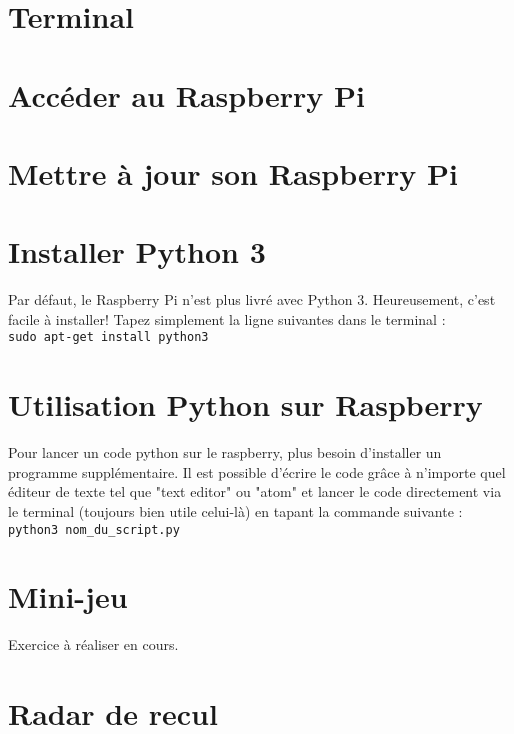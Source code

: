 \section{Terminal}


\section{Accéder au Raspberry Pi}


\section{Mettre à jour son Raspberry Pi}


\section{Installer Python 3}
Par défaut, le Raspberry Pi n'est plus livré avec Python 3. Heureusement, c'est facile à installer! Tapez simplement la ligne suivantes dans le terminal :\\

\texttt{sudo apt-get install python3}\\


\section{Utilisation Python sur Raspberry}

Pour lancer un code python sur le raspberry, plus besoin d'installer un programme supplémentaire. Il est possible d'écrire le code grâce à n'importe quel éditeur de texte tel que "text editor" ou "atom" et lancer le code directement via le terminal (toujours bien utile celui-là) en tapant la commande suivante : \\

\texttt{python3 nom\_du\_script.py}\\


\section{Mini-jeu}
Exercice à réaliser en cours.

\section{Radar de recul}

